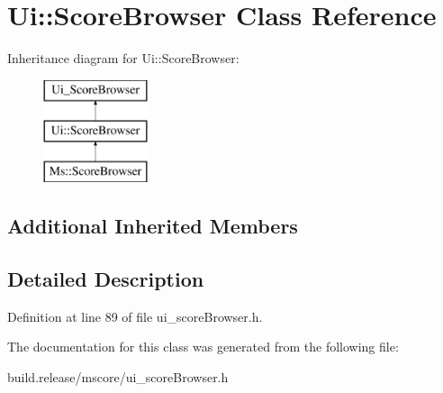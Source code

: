 \hypertarget{class_ui_1_1_score_browser}{}\section{Ui\+:\+:Score\+Browser Class Reference}
\label{class_ui_1_1_score_browser}
Inheritance diagram for Ui\+:\+:Score\+Browser\+:\begin{figure}[H]
\begin{center}
\leavevmode
\includegraphics[height=3.000000cm]{class_ui_1_1_score_browser}
\end{center}
\end{figure}
\subsection*{Additional Inherited Members}


\subsection{Detailed Description}


Definition at line 89 of file ui\+\_\+score\+Browser.\+h.



The documentation for this class was generated from the following file\+:\begin{DoxyCompactItemize}
\item 
build.\+release/mscore/ui\+\_\+score\+Browser.\+h\end{DoxyCompactItemize}
